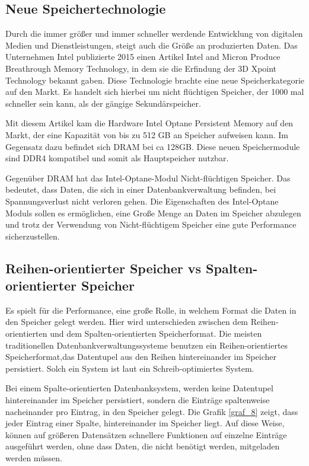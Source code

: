 \subsection{Neue Speichertechnologie}
Durch die immer größer und immer schneller werdende Entwicklung von digitalen Medien und Dienstleistungen, steigt auch die Größe an produzierten Daten. 
Das Unternehmen Intel publizierte 2015 einen Artikel \glqq{}Intel and Micron Produce Breathrough Memory Technology\grqq{}, in dem sie die Erfindung der \glqq{}3D Xpoint\grqq{} Technology bekannt gaben. Diese Technologie brachte eine neue Speicherkategorie auf den Markt. Es handelt sich hierbei um nicht flüchtigen Speicher, der 1000 mal schneller sein kann, als der gängige Sekundärspeicher. \cite{Intel:MemoryTechnology}

Mit diesem Artikel kam die Hardware Intel Optane Persistent Memory auf den Markt, der eine Kapazität von bis zu 512 GB an Speicher aufweisen kann.
Im Gegensatz dazu befindet sich DRAM bei ca 128GB.
Diese neuen Speichermodule sind DDR4 kompatibel und somit als Hauptspeicher nutzbar. \cite{IntelOptane:Micron}

Gegenüber DRAM hat das Intel-Optane-Modul Nicht-flüchtigen Speicher. Das bedeutet, dass  Daten, die sich in einer Datenbankverwaltung befinden, bei Spannungsverlust nicht verloren gehen.
Die Eigenschaften des Intel-Optane Moduls sollen es ermöglichen, eine Große Menge an Daten im Speicher abzulegen und trotz der Verwendung von Nicht-flüchtigem Speicher eine gute Performance sicherzustellen.
 
\subsection{Reihen-orientierter Speicher vs Spalten-orientierter Speicher}
Es spielt für die Performance, eine große Rolle, in welchem Format die Daten in den Speicher gelegt werden. Hier wird unterschieden zwischen dem Reihen-orientierten und dem Spalten-orientierten Speicherformat.
Die meisten traditionellen Datenbankverwaltungssysteme benutzen ein Reihen-orientiertes Speicherformat,das Datentupel aus den Reihen hintereinander im Speicher persistiert. Solch ein System ist laut \cite{Stonebraker2005CStoreAC} ein \glqq{}Schreib-optimiertes System\grqq{}.

Bei einem Spalte-orientierten Datenbanksystem, werden keine Datentupel hintereinander im Speicher persistiert, sondern die Einträge spaltenweise nacheinander pro Eintrag, in den Speicher gelegt. Die Grafik \ref{graf_8} zeigt, dass jeder Eintrag einer Spalte, hintereinander im Speicher liegt. Auf diese Weise, können auf größeren Datensätzen schnellere Funktionen auf einzelne Einträge ausgeführt werden, ohne dass Daten, die nicht benötigt werden, mitgeladen werden müssen.

